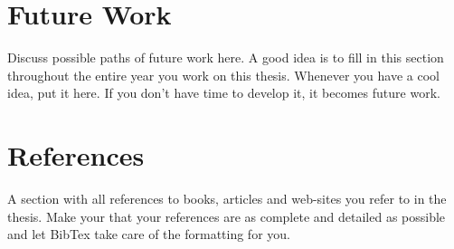 \documentclass[british]{article}
\begin{document}
\section*{Future Work}

Discuss possible paths of future work here. A good idea is to fill in this section throughout the entire year you work on this thesis. Whenever you have a cool idea, put it here. If you don’t have time to develop it, it becomes future work.

\section*{References}
A section with all references to books, articles and web-sites you
refer to in the thesis. Make your that your references are as complete
and detailed as possible and let BibTex take care of the formatting
for you.
\end{document}
